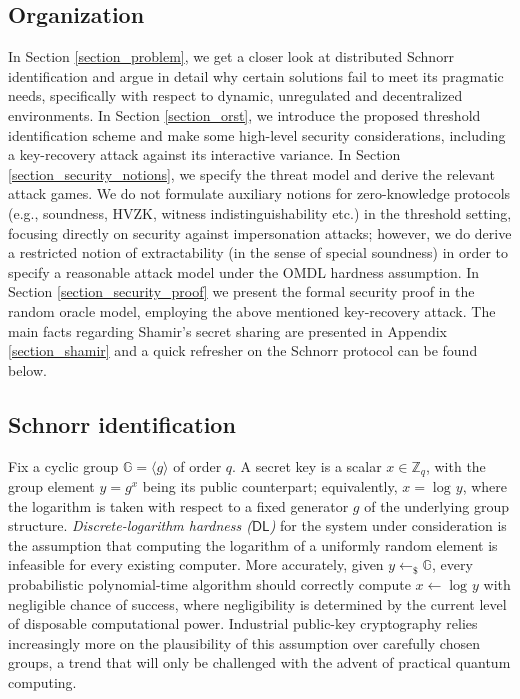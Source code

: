 \documentclass{iacrtrans}
\begin{document}
\subsection{Organization}\label{section_organization}
In Section \ref{section_problem}, we get a closer look
at distributed Schnorr identification
and argue in detail why certain solutions
fail to meet its pragmatic needs,
specifically with respect to
dynamic, unregulated and decentralized environments.
In Section \ref{section_orst}, we introduce the
proposed threshold identification scheme
and make some high-level security considerations,
including a key-recovery attack against
its interactive variance.
In Section \ref{section_security_notions},
we specify the threat model
and derive the relevant attack games.
We do not formulate auxiliary notions
for zero-knowledge protocols
(e.g., soundness, HVZK,
witness indistinguishability etc.)
in the threshold setting,
focusing directly on security against impersonation attacks;
however, we do derive a restricted notion of extractability
(in the sense of special soundness)
in order to specify a reasonable attack model
under the OMDL hardness assumption.
In Section \ref{section_security_proof} we present
the formal security proof in the random oracle model,
employing the above mentioned key-recovery attack.
The main facts regarding Shamir's secret sharing
are presented in Appendix \ref{section_shamir}
and a quick refresher on the
Schnorr protocol can be found below.

\subsection{Schnorr identification}\label{section_schnorr}

\noindent
Fix a cyclic group $\mathbb{G} = \langle g \rangle$ of order $q$.
A secret key is a scalar $x \in \mathbb{Z}_q$,
with the group element $y = g ^ x$
being its public counterpart;
equivalently, $x = \log\hspace{1pt} y$,
where the logarithm is taken with respect to a fixed
generator $g$ of the underlying group structure.
\textit{Discrete-logarithm hardness \textup{($\mathsf{DL}$)}} for
the system under consideration
is the assumption that computing the logarithm of
a uniformly random element is infeasible
for every existing computer.
More accurately, given $y \leftarrow_\$ \mathbb{G}$,
every probabilistic polynomial-time algorithm
should correctly compute $x \leftarrow \log\hspace{1pt} y$
with negligible chance of success,
where negligibility is determined by
the current level of disposable computational power.
Industrial public-key cryptography relies increasingly more
on the plausibility of this assumption over
carefully chosen groups, a trend that will
only be challenged with the advent of practical quantum computing.
\end{document}
